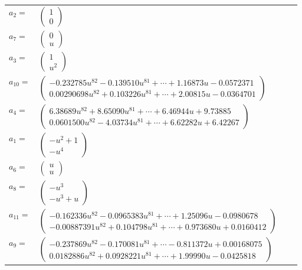 \documentclass[1p]{elsarticle_modified}
\theoremstyle{definition}
\begin{document}
\begin{tabular}{m{7pt} m{180pt} m{7pt} m{180pt} }
\flushright $a_{2}=$&$\begin{pmatrix}1\\0\end{pmatrix}$ \\
\flushright $a_{7}=$&$\begin{pmatrix}0\\u\end{pmatrix}$ \\
\flushright $a_{3}=$&$\begin{pmatrix}1\\u^2\end{pmatrix}$ \\
\flushright $a_{10}=$&$\begin{pmatrix}-0.232785 u^{82}-0.139510 u^{81}+\cdots+1.16873 u-0.0572371\\0.00290698 u^{82}+0.103226 u^{81}+\cdots+2.00815 u-0.0364701\end{pmatrix}$ \\
\flushright $a_{4}=$&$\begin{pmatrix}6.38689 u^{82}+8.65090 u^{81}+\cdots+6.46944 u+9.73885\\0.0601500 u^{82}-4.03734 u^{81}+\cdots+6.62282 u+6.42267\end{pmatrix}$ \\
\flushright $a_{1}=$&$\begin{pmatrix}- u^2+1\\- u^4\end{pmatrix}$ \\
\flushright $a_{6}=$&$\begin{pmatrix}u\\u\end{pmatrix}$ \\
\flushright $a_{8}=$&$\begin{pmatrix}- u^3\\- u^3+u\end{pmatrix}$ \\
\flushright $a_{11}=$&$\begin{pmatrix}-0.162336 u^{82}-0.0965383 u^{81}+\cdots+1.25096 u-0.0980678\\-0.00887391 u^{82}+0.104798 u^{81}+\cdots+0.973680 u+0.0160412\end{pmatrix}$ \\
\flushright $a_{9}=$&$\begin{pmatrix}-0.237869 u^{82}-0.170081 u^{81}+\cdots-0.811372 u+0.00168075\\0.0182886 u^{82}+0.0928221 u^{81}+\cdots+1.99990 u-0.0425818\end{pmatrix}$ \\

\end{tabular}
\end{document}
